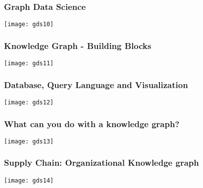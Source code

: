 \begin{frame}[fragile]\frametitle{Graph Data Science}

\begin{center}
\texttt{[image: gds10]}
\end{center}

\end{frame}

\begin{frame}[fragile]\frametitle{Knowledge Graph - Building Blocks}

\begin{center}
\texttt{[image: gds11]}
\end{center}

\end{frame}

\begin{frame}[fragile]\frametitle{Database, Query Language and Visualization}

\begin{center}
\texttt{[image: gds12]}
\end{center}

\end{frame}

\begin{frame}[fragile]\frametitle{What can you do with a knowledge graph?}

\begin{center}
\texttt{[image: gds13]}
\end{center}

\end{frame}

\begin{frame}[fragile]\frametitle{Supply Chain: Organizational Knowledge graph}

\begin{center}
\texttt{[image: gds14]}
\end{center}

\end{frame}

